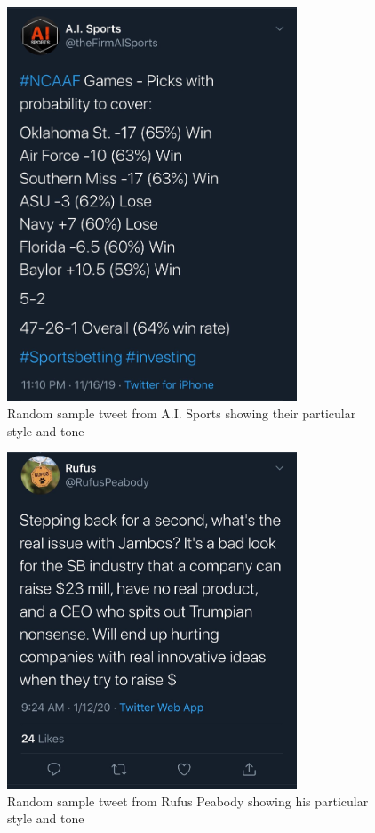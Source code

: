 \documentclass[5p,authoryear]{elsarticle}
\begin{document}
\begin{figure}[!htb] \centering
	\includegraphics[width=3.4in]{figures/AISports_Tweet.jpg}
	\caption[]{Random sample tweet from A.I. Sports showing their particular style and tone} \label{aisports} 
\end{figure}


\begin{figure}[!htb] \centering
	\includegraphics[width=3.4in]{figures/Rufus_Tweet.jpg}
	\caption[]{Random sample tweet from Rufus Peabody showing his particular style and tone} 
	\label{rufus} 
\end{figure}
\end{document}
